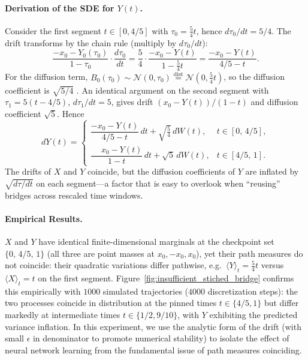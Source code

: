 \paragraph{Derivation of the SDE for $Y(t)$.}
Consider the first segment $t\in[0,4/5]$ with $\tau_0=\tfrac{5}{4}t$,
hence $d\tau_0/dt=5/4$. The drift transforms by the chain rule (multiply
by $d\tau_0/dt$):
\begin{equation}
\frac{-x_0 - Y_0(\tau_0)}{1-\tau_0}\cdot\frac{d\tau_0}{dt}
= \frac{5}{4}\cdot\frac{-x_0 - Y(t)}{1-\tfrac{5}{4}t}
= \frac{-x_0 - Y(t)}{4/5 - t}.
\end{equation}
For the diffusion term, $B_0(\tau_0) \sim \mathcal{N}(0, \tau_0) \overset{\text{dist}}{=} \mathcal{N}\left(0, \frac{5}{4}t\right)$, so the diffusion
coefficient is $\sqrt{5/4}$ \cite{karatzas2014brownian, oksendal2003stochastic, steele2001stochastic}. An identical argument on the second segment
with $\tau_1=5(t-4/5)$, $d\tau_1/dt=5$, gives drift
$(x_0 - Y(t))/(1-t)$ and diffusion coefficient $\sqrt{5}$. Hence
\begin{equation}
dY(t) =
\begin{cases}
\dfrac{-x_0 - Y(t)}{4/5 - t}\,dt + \sqrt{\tfrac{5}{4}}\,dW(t),
  & t \in [0,\,4/5],\\[6pt]
\dfrac{\phantom{-}x_0 - Y(t)}{1 - t}\,dt + \sqrt{5}\,dW(t),
  & t \in [4/5,\,1].
\end{cases}
\label{eq:Y-sde}
\end{equation}
The drifts of $X$ and $Y$ coincide, but the diffusion coefficients of
$Y$ are inflated by $\sqrt{d\tau/dt}$ on each segment---a factor that is
easy to overlook when ``reusing'' bridges across rescaled
time windows.

\paragraph{Empirical Results.}
$X$ and $Y$ have identical finite-dimensional marginals at the checkpoint set
$\{0,\,4/5,\,1\}$ (all three are point masses at $x_0,-x_0,x_0$), yet
their path measures do not coincide: their quadratic variations
differ pathwise, e.g.\ $\langle Y\rangle_t=\tfrac{5}{4}t$ versus
$\langle X\rangle_t=t$ on the first segment. Figure~\ref{fig:insufficient_stiched_bridge}
confirms this empirically with $1000$ simulated trajectories ($4000$ discretization steps): the two
processes coincide in distribution at the pinned times $t\in\{4/5,1\}$
but differ markedly at intermediate times $t\in\{1/2,9/10\}$, with $Y$
exhibiting the predicted variance inflation.
In this experiment, we use the analytic form of the drift (with small $\epsilon$ in denominator to promote numerical stability) to isolate the effect of neural network learning from the fundamental issue of path measures coinciding.
